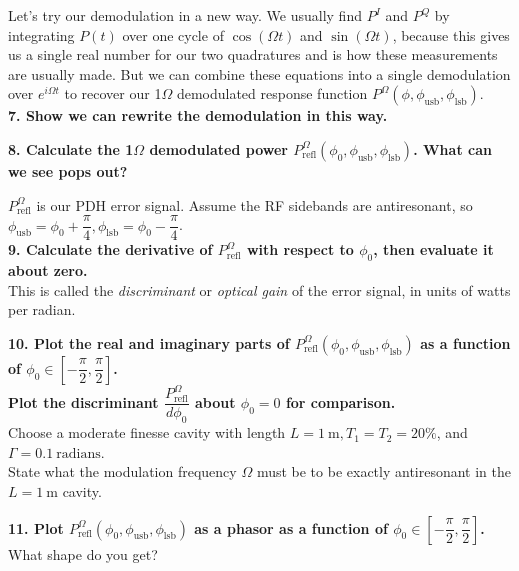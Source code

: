 \documentclass[11pt]{article}
\begin{document}
\vspace{0.5cm}

Let's try our demodulation in a new way.
We usually find $P^I$ and $P^Q$ by integrating $P(t)$ over one cycle of $\cos(\Omega t)$ and $\sin(\Omega t)$, because this gives us a single real number for our two quadratures and is how these measurements are usually made. 
But we can combine these equations into a single demodulation over $e^{i \Omega t}$ to recover our 1$\Omega$ demodulated response function $P^{\Omega}(\phi, \phi_\mathrm{usb}, \phi_\mathrm{lsb})$.\\
\textcolor{Mahogany}{\textbf{7. Show we can rewrite the demodulation in this way.}}

\vspace{0.5cm}
\noindent
\textcolor{Mahogany}{\textbf{8. Calculate the 1$\Omega$ demodulated power $P^\Omega_\mathrm{refl}(\phi_0, \phi_\mathrm{usb}, \phi_\mathrm{lsb})$.  What can we see pops out?}}

\vspace{0.5cm}
\noindent
$P^\Omega_\mathrm{refl}$ is our PDH error signal. 
Assume the RF sidebands are antiresonant, so $\phi_\mathrm{usb} = \phi_0 + \dfrac{\pi}{4}, \phi_\mathrm{lsb} = \phi_0 - \dfrac{\pi}{4}$.\\
\textcolor{Mahogany}{\textbf{9. Calculate the derivative of $P^\Omega_\mathrm{refl}$ with respect to $\phi_0$, then evaluate it about zero.}}\\
This is called the \textit{discriminant} or \textit{optical gain} of the error signal, in units of watts per radian.  

\vspace{0.5cm}
\noindent
\textcolor{Mahogany}{\textbf{10. Plot the real and imaginary parts of $P^\Omega_\mathrm{refl}(\phi_0, \phi_\mathrm{usb}, \phi_\mathrm{lsb})$ as a function of $\phi_0 \in [-\dfrac{\pi}{2}, \dfrac{\pi}{2}]$.\\
Plot the discriminant $\dfrac{P^\Omega_\mathrm{refl}}{d \phi_0}$ about $\phi_0 = 0$ for comparison.}}\\
Choose a moderate finesse cavity with length $L = 1~\mathrm{m}, T_1 = T_2 = 20\%$, and $\Gamma = 0.1~\mathrm{radians}$.\\
State what the modulation frequency $\Omega$ must be to be exactly antiresonant in the $L = 1~\mathrm{m}$ cavity.

\vspace{0.5cm}
\noindent
\textcolor{Mahogany}{\textbf{11. Plot $P^\Omega_\mathrm{refl}(\phi_0, \phi_\mathrm{usb}, \phi_\mathrm{lsb})$ as a phasor as a function of $\phi_0 \in [-\dfrac{\pi}{2}, \dfrac{\pi}{2}]$.}}\\
What shape do you get?
\end{document}

